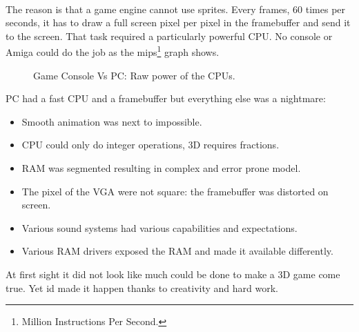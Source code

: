 \\
The reason is that a game engine cannot use sprites. Every frames, 60 times per seconds, it has to draw a full screen pixel per pixel in the framebuffer and send it to the screen. That task required a particularly powerful CPU. No console or Amiga could do the job as the mips\footnote{Million Instructions Per Second.} graph shows.
\\
\begin{figure}[H]
\centering
   \caption{Game Console Vs PC: Raw power of the CPUs.} \label{fig:game_console_vs_PC}
 \end{figure}
 
PC had a fast CPU and a framebuffer but everything else was a nightmare:
\begin{itemize}
\item Smooth animation was next to impossible.
\item CPU could only do integer operations, 3D requires fractions.
\item RAM was segmented resulting in complex and error prone model.
\item The pixel of the VGA were not square: the framebuffer was distorted on screen.
\item Various sound systems had various capabilities and expectations.
\item Various RAM drivers exposed the RAM and made it available differently.
\end{itemize}

At first sight it did not look like much could be done to make a 3D game come true. Yet id made it happen thanks to creativity and hard work.

